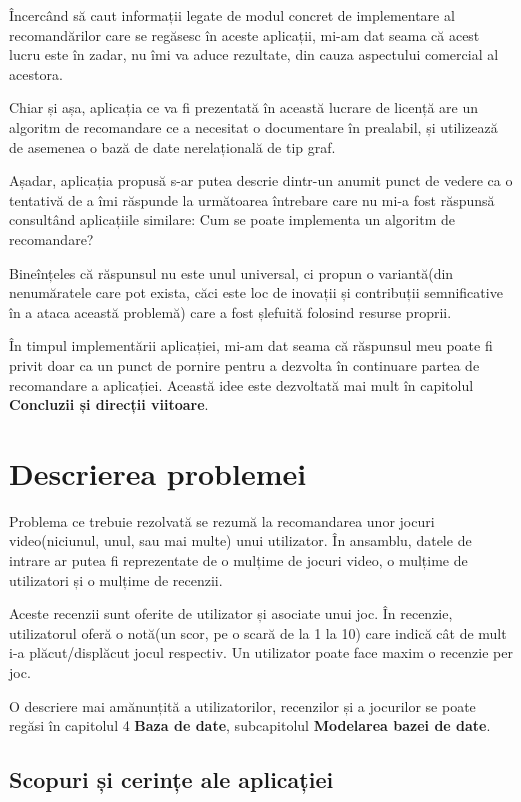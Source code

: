 \documentclass[12pt,a4paper]{report}
\begin{document}
Încercând să caut informații legate de modul concret de implementare al recomandărilor care se regăsesc în aceste aplicații, mi-am dat seama că acest lucru este în zadar, nu îmi va aduce rezultate, din cauza aspectului comercial al acestora.

Chiar și așa, aplicația ce va fi prezentată în această lucrare de licență are un algoritm de recomandare ce a necesitat o documentare în prealabil, și utilizează de asemenea o bază de date nerelațională de tip graf.

Așadar, aplicația propusă s-ar putea descrie dintr-un anumit punct de vedere ca o tentativă de a îmi răspunde la următoarea întrebare care nu mi-a fost răspunsă consultând aplicațiile similare: Cum se poate implementa un algoritm de recomandare?

Bineînțeles că răspunsul nu este unul universal, ci propun o variantă(din nenumăratele care pot exista, căci este loc de inovații și contribuții semnificative în a ataca această problemă) care a fost șlefuită folosind resurse proprii.

În timpul implementării aplicației, mi-am dat seama că răspunsul meu poate fi privit doar ca un punct de pornire pentru a dezvolta în continuare partea de recomandare a aplicației. Această idee este dezvoltată mai mult în capitolul \textbf{Concluzii și direcții viitoare}.
	
	
\newpage
	
\setcounter{secnumdepth}{3} 
\renewcommand*\thesection{\arabic{section}}
\section{Descrierea problemei}

Problema ce trebuie rezolvată se rezumă la recomandarea unor jocuri video(niciunul, unul, sau mai multe) unui utilizator. În ansamblu, datele de intrare ar putea fi reprezentate de o mulțime de jocuri video, o mulțime de utilizatori și o mulțime de recenzii.

Aceste recenzii sunt oferite de utilizator și asociate unui joc. În recenzie, utilizatorul oferă o notă(un scor, pe o scară de la 1 la 10) care indică cât de mult i-a plăcut/displăcut jocul respectiv. Un utilizator poate face maxim o recenzie per joc.

O descriere mai amănunțită a utilizatorilor, recenzilor și a jocurilor se poate regăsi în capitolul 4 \textbf{Baza de date}, subcapitolul \textbf{Modelarea bazei de date}.

\subsection{Scopuri și cerințe ale aplicației}
\end{document}
